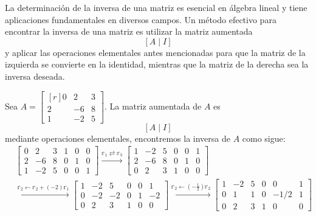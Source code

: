 La determinación de la inversa de una matriz es esencial en álgebra lineal y tiene aplicaciones fundamentales en diversos campos. Un método efectivo para encontrar la inversa de una matriz es utilizar la matriz aumentada
$$[A \mid I]$$
y aplicar las operaciones elementales antes mencionadas para que la matriz de la izquierda se convierte en la identidad, mientras que la matriz de la derecha sea la inversa deseada.

\begin{example}\label{GVSDVGVGVFGVGFGVGVGVDODSOPDKODSOKDSOKDSOP}
    Sea $A = \begin{bmatrix*}[r]
        0 & 2 & 3 \\
        2 & -6 & 8 \\
        1 & -2 & 5
    \end{bmatrix*}$. La matriz aumentada de $A$ es
    $$[A \mid I]$$
    mediante operaciones elementales, encontremos la inversa de $A$ como sigue:
    \begin{align*}
        & \left[ \begin{array}{rrr|rrr}
            0 & 2 & 3 & 1 & 0 & 0 \\
            2 & -6 & 8 & 0 & 1 & 0 \\
            1 & -2 & 5 & 0 & 0 & 1
        \end{array} \right] \xrightarrow{\mathbb{r}_1 \rightleftarrows \mathbb{r}_3} \left[ \begin{array}{rrr|rrr}
            1 & -2 & 5 & 0 & 0 & 1 \\
            2 & -6 & 8 & 0 & 1 & 0 \\
            0 & 2 & 3 & 1 & 0 & 0
        \end{array} \right] \\
        & \xrightarrow{\mathbb{r}_2 \leftarrow \mathbb{r}_2 + (-2) \mathbb{r}_1} \left[ \begin{array}{rrr|rrr}
            1 & -2 & 5 & 0 & 0 & 1 \\
            0 & -2 & -2 & 0 & 1 & -2 \\
            0 & 2 & 3 & 1 & 0 & 0
        \end{array} \right] \xrightarrow{\mathbb{r}_2 \leftarrow (-\frac{1}{2}) \mathbb{r}_2} \left[ \begin{array}{rrr|rrr}
            1 & -2 & 5 & 0 & 0 & 1 \\
            0 & 1 & 1 & 0 & -1/2 & 1 \\
            0 & 2 & 3 & 1 & 0 & 0
        \end{array} \right] \\

\end{align*}
\end{example}

